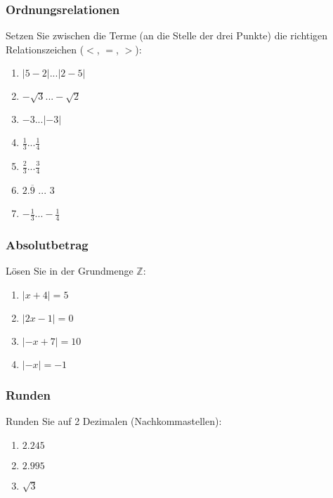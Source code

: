 \subsubsection{Ordnungsrelationen}
Setzen Sie zwischen die Terme (an die Stelle der drei Punkte) die
richtigen Relationszeichen ($<$, $=$, $>$):

\begin{multicols}{2}
\begin{enumerate}[label=\alph*)]
 \item$|5-2| ... |2-5|$ \TRAINER{$=$}
 \item$-\sqrt{3} ... -\sqrt{2}$ \TRAINER{$<$}
 \item$-3 ... |-3|$ \TRAINER{$<$}
 \item$\frac{1}{3} ... \frac{1}{4}$ \TRAINER{$>$}
 \item$\frac{2}{3} ... \frac{3}{4}$ \TRAINER{$<$}
 \item$2.\overline{9}$ ... 3\TRAINER{$=$}
 \item$-\frac{1}{3} ... -\frac{1}{4}$ \TRAINER{$<$}
\end{enumerate}
\end{multicols}


\subsubsection{Absolutbetrag}
Lösen Sie in der Grundmenge $\mathbb{Z}$:

\begin{multicols}{2}
\begin{enumerate}[label=\alph*)]
 \item$|x+4| = 5$ 
 \item$|2x-1| = 0$ 
 \item$|-x + 7| = 10$ 
 \item$|-x|=-1$ \TRAINER{$\LoesungsMenge{}=\{\}$}
\end{enumerate}
\end{multicols}

\subsubsection{Runden}
Runden Sie auf 2 Dezimalen (Nachkommastellen):

\begin{multicols}{3}
\begin{enumerate}[label=\alph*)]
 \item$2.245$ 
 \item$2.995$ 
 \item$\sqrt{3}$ 
\end{enumerate}
\end{multicols}

